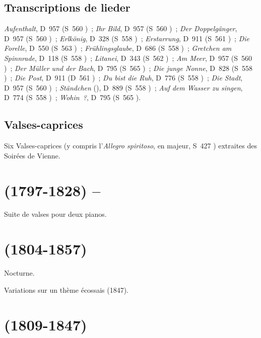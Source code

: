 \subsection{Transcriptions de lieder}

\emph{Aufenthalt}, D~957  (S~560 )~; \emph{Ihr Bild},
D~957  (S~560 )~; \emph{Der Doppelgänger}, D~957
 (S~560 )~; \emph{Erlkönig}, D~328 (S~558
)~; \emph{Erstarrung}, D~911  (S~561 )~;
\emph{Die Forelle}, D~550 (S~563 )~; \emph{Frühlingsglaube}, D~686
(S~558 )~; \emph{Gretchen am Spinnrade}, D~118 (S~558
)~; \emph{Litanei}, D~343 (S~562 )~; \emph{Am Meer},
D~957  (S~560 )~; \emph{Der Müller und der Bach}, D~795
 (S~565 )~; \emph{Die junge Nonne}, D~828 (S~558
)~; \emph{Die Post}, D~911  (D~561 )~;
\emph{Du bist die Ruh}, D~776 (S~558 )~; \emph{Die Stadt}, D~957
 (S~560 )~; \emph{Ständchen} (), D~889 (S~558 )~; \emph{Auf dem Wasser zu
singen}, D~774 (S~558 )~; \emph{Wohin~?}, D~795  (S~565
).

\subsection{Valses-caprices}

Six Valses-caprices (y compris l'\emph{Allegro spiritoso},  en \kA
majeur, S~427 ) extraites des Soirées de Vienne.

\section[%
Franz Schubert (1797-1828) -- Sergej Prokof'ev]{%
\FSchubert{} (1797-1828) -- \SProkofiev{}}

Suite de valses pour deux pianos.

\section[%
Michail Glinka (1804-1857)]{%
\MGlinka{} (1804-1857)}

Nocturne.

Variations sur un thème écossais (1847).

\section[%
Felix Mendelssohn-Bartholdy (1809-1847)]{%
\FMendelssohn{} (1809-1847)}


